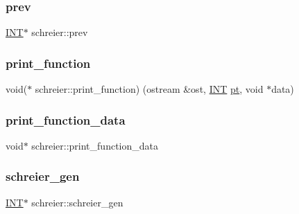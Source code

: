 \mbox{\label{classschreier_ae542cd9edea071ce80c57b3d1eff42d2}} 
\subsubsection{\texorpdfstring{prev}{prev}}
{\footnotesize\ttfamily \mbox{\hyperlink{galois_8h_a09fddde158a3a20bd2dcadb609de11dc}{I\+NT}}$\ast$ schreier\+::prev}

\mbox{\label{classschreier_a18a47a5aedd4f1b1117f86996e73d231}} 
\subsubsection{\texorpdfstring{print\+\_\+function}{print\_function}}
{\footnotesize\ttfamily void($\ast$ schreier\+::print\+\_\+function) (ostream \&ost, \mbox{\hyperlink{galois_8h_a09fddde158a3a20bd2dcadb609de11dc}{I\+NT}} \mbox{\hyperlink{clique__finder_8_c_aec1f1a2b30fdca8844c2932384483145}{pt}}, void $\ast$data)}

\mbox{\label{classschreier_a16651f51c7ef31b291b4d739cbae8700}} 
\subsubsection{\texorpdfstring{print\+\_\+function\+\_\+data}{print\_function\_data}}
{\footnotesize\ttfamily void$\ast$ schreier\+::print\+\_\+function\+\_\+data}

\mbox{\label{classschreier_a52d46160cf70f55df70d39e825f3008b}} 
\subsubsection{\texorpdfstring{schreier\+\_\+gen}{schreier\_gen}}
{\footnotesize\ttfamily \mbox{\hyperlink{galois_8h_a09fddde158a3a20bd2dcadb609de11dc}{I\+NT}}$\ast$ schreier\+::schreier\+\_\+gen}

